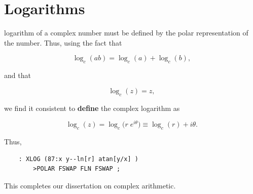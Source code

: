 \section{Logarithms} 
 logarithm of a complex number must be defined by the polar representation of the number. Thus, using the fact that

\begin{equation}
  \log_c(ab) = \log_c(a) + \log_c(b) ,
\end{equation}

and that

\begin{equation}
  \log_c(z) = z ,
\end{equation}

we find it consistent to \textbf{define} the complex logarithm as

\begin{equation}
  \log_c(z) = \log_c\big(r\;e^{i\theta}\big) \equiv \log_c(r) + i\theta.
\end{equation}

Thus,

\begin{lstlisting}
    : XLOG (87:x y--ln[r] atan[y/x] )
        >POLAR FSWAP FLN FSWAP ;
\end{lstlisting}

This completes our dissertation on complex arithmetic.